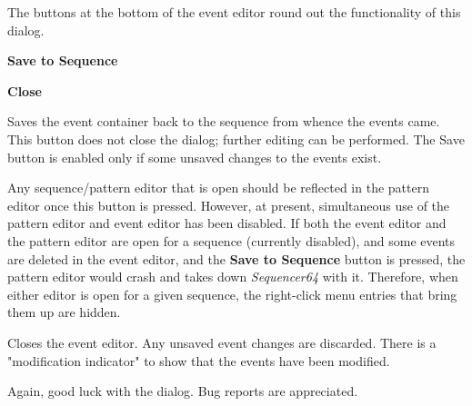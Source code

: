    The buttons at the bottom of the event editor round out the functionality of
   this dialog.

   \begin{enumber}
      \item \textbf{Save to Sequence}
      \item \textbf{Close}
   \end{enumber}

   \setcounter{ItemCounter}{0}      %

   Saves the event container back to the sequence from
   whence the events came.  This button does not close the dialog; further
   editing can be performed.  The Save button is enabled only if
   some unsaved changes to the events exist.

   Any sequence/pattern editor that is open should be reflected
   in the pattern editor once this button is pressed.  However, at present,
   simultaneous use of the pattern editor and event editor has been disabled.
   If both the event editor and the pattern editor are open for a sequence
   (currently disabled), and
   some events are deleted in the event editor, and the
   \textbf{Save to Sequence} button is pressed, the pattern editor would
   crash and
   takes down \textsl{Sequencer64} with it.  Therefore, when either editor is
   open for a given sequence, the right-click menu entries that bring them up
   are hidden.

   Closes the event editor.
   Any unsaved event changes are discarded.
   There is a "modification indicator" to show that the events have
   been modified.

   Again, good luck with the dialog.  Bug reports are appreciated.

